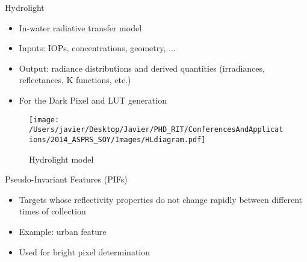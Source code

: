 \documentclass{beamer}
\begin{document}
\begin{frame}{}
\begin{columns}[t]
\begin{column}{.3\linewidth}
\begin{block}{Hydrolight}
\small
\begin{itemize}
	\item In-water radiative transfer model\cite{MobleyHE}
	\item Inputs: IOPs, concentrations, geometry, ...
	\item Output: radiance distributions and derived quantities (irradiances, reflectances, K functions, etc.)
	\item For the Dark Pixel and LUT generation
\end{itemize}
\vspace{1em}
\begin{figure}[H]
		\texttt{[image: /Users/javier/Desktop/Javier/PHD\_RIT/ConferencesAndApplications/2014\_ASPRS\_SOY/Images/HLdiagram.pdf]}
		\caption{Hydrolight model}
\end{figure}
\hspace{12cm}{\scriptsize $*~$IOPs: Inherent Optical Properties}
\end{block}
\begin{block}{Pseudo-Invariant Features (PIFs)}
\small
\begin{itemize}
	\item Targets whose reflectivity properties do not change rapidly between different times of collection\cite{Schott:1988} 
	\item Example: urban feature
	\item Used for bright pixel determination
\end{itemize}

\vspace{1cm}
\begin{figure}[htb]
	\centering
{}
\end{figure}
\end{block}
\end{column}
\end{columns}
\end{frame}
\end{document}

